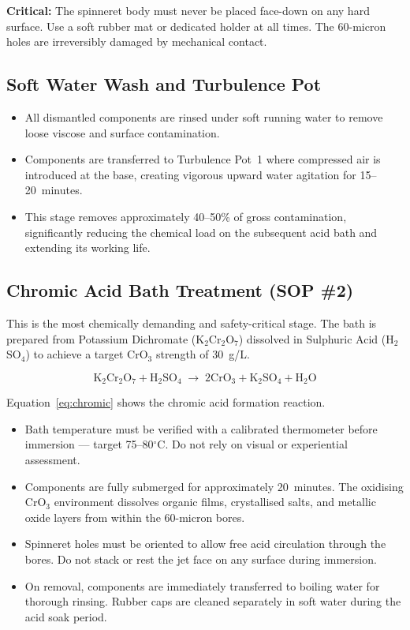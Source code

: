 \documentclass{book}
\begin{document}
\begin{infobox}
\textbf{Critical:} The spinneret body must never be placed face-down on any hard surface. Use a soft rubber mat or dedicated holder at all times. The 60-micron holes are irreversibly damaged by mechanical contact.
\end{infobox}

\subsection{Soft Water Wash and Turbulence Pot}

\begin{itemize}[leftmargin=1.5em]
  \item All dismantled components are rinsed under soft running water to remove loose viscose and surface contamination.
  \item Components are transferred to Turbulence Pot~1 where compressed air is introduced at the base, creating vigorous upward water agitation for 15--20~minutes.
  \item This stage removes approximately 40--50\% of gross contamination, significantly reducing the chemical load on the subsequent acid bath and extending its working life.
\end{itemize}

\subsection{Chromic Acid Bath Treatment (SOP \#2)}

This is the most chemically demanding and safety-critical stage. The bath is prepared from Potassium Dichromate (K$_2$Cr$_2$O$_7$) dissolved in Sulphuric Acid (H$_2$SO$_4$) to achieve a target CrO$_3$ strength of 30~g/L.

\begin{equation}
  \text{K}_2\text{Cr}_2\text{O}_7 + \text{H}_2\text{SO}_4 \;\longrightarrow\; 2\text{CrO}_3 + \text{K}_2\text{SO}_4 + \text{H}_2\text{O}
  \label{eq:chromic}
\end{equation}

Equation~\eqref{eq:chromic} shows the chromic acid formation reaction.

\begin{itemize}[leftmargin=1.5em]
  \item Bath temperature must be verified with a calibrated thermometer before immersion --- target 75--80$^\circ$C. Do not rely on visual or experiential assessment.
  \item Components are fully submerged for approximately 20~minutes. The oxidising CrO$_3$ environment dissolves organic films, crystallised salts, and metallic oxide layers from within the 60-micron bores.
  \item Spinneret holes must be oriented to allow free acid circulation through the bores. Do not stack or rest the jet face on any surface during immersion.
  \item On removal, components are immediately transferred to boiling water for thorough rinsing. Rubber caps are cleaned separately in soft water during the acid soak period.
\end{itemize}
\end{document}

